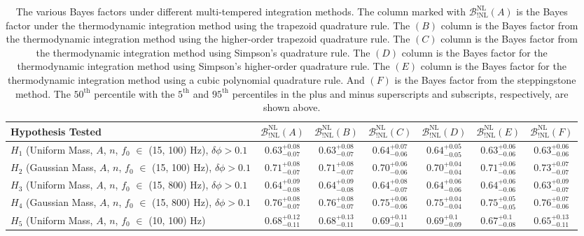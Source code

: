 \newpage

\begin{table}
\centering
\begin{tabularx}{1.0\textwidth}{l| c |c| c| c| c| c}
\hline\hline
 Hypothesis Tested  & $\mathcal{B}^{\mathrm{NL}}_{\mathrm{!NL}}(A)$  & $\mathcal{B}^{\mathrm{NL}}_{\mathrm{!NL}}(B)$ & $\mathcal{B}^{\mathrm{NL}}_{\mathrm{!NL}}(C)$ & $\mathcal{B}^{\mathrm{NL}}_{\mathrm{!NL}}(D)$ & $\mathcal{B}^{\mathrm{NL}}_{\mathrm{!NL}}(E)$ & $\mathcal{B}^{\mathrm{NL}}_{\mathrm{!NL}}(F)$\\
\hline\hline
$H_1$ (Uniform Mass, $A$, $n$, $f_0$ $\in$ (15, 100) Hz), $\delta \phi > 0.1$ &
$0.63^{+0.08}_{-0.07}$ & $0.63^{+0.08}_{-0.07}$ & $0.64^{+0.07}_{-0.06}$ & $0.64^{+0.05}_{-0.05}$ & $0.63^{+0.06}_{-0.06}$ & $0.63^{+0.06}_{-0.06}$ \\ 
\hline
$H_2$ (Gaussian Mass, $A$, $n$, $f_0$ $\in$ (15, 100) Hz), $\delta \phi > 0.1$ &
$0.71^{+0.08}_{-0.07}$ & $0.71^{+0.08}_{-0.07}$ & $0.70^{+0.06}_{-0.06}$ & $0.70^{+0.04}_{-0.04}$ & $0.71^{+0.06}_{-0.06}$ & $0.73^{+0.07}_{-0.07}$ \\ 
\hline
$H_3$ (Uniform Mass, $A$, $n$, $f_0$ $\in$ (15, 800) Hz), $\delta \phi > 0.1$ &
$0.64^{+0.09}_{-0.08}$ & $0.64^{+0.09}_{-0.08}$ & $0.64^{+0.08}_{-0.07}$ & $0.64^{+0.06}_{-0.06}$ & $0.64^{+0.06}_{-0.06}$ & $0.63^{+0.09}_{-0.07}$ \\ 
\hline
$H_4$ (Gaussian Mass, $A$, $n$, $f_0$ $\in$ (15, 800) Hz), $\delta \phi > 0.1$ &
$0.76^{+0.08}_{-0.07}$ & $0.76^{+0.08}_{-0.07}$ & $0.75^{+0.06}_{-0.06}$ & $0.75^{+0.04}_{-0.04}$ & $0.75^{+0.05}_{-0.05}$ & $0.76^{+0.07}_{-0.06}$ \\ 
\hline
$H_5$ (Uniform Mass, $A$, $n$, $f_0$ $\in$ (10, 100) Hz) &
$0.68^{+0.12}_{-0.11}$ & $0.68^{+0.13}_{-0.11}$ & $0.69^{+0.11}_{-0.1}$ & $0.69^{+0.1}_{-0.09}$ & $0.67^{+0.1}_{-0.08}$ & $0.65^{+0.13}_{-0.11}$ \\
\hline\hline
\end{tabularx}
\caption{The various Bayes factors under different multi-tempered integration methods. The column marked with $\mathcal{B}^{\mathrm{NL}}_{\mathrm{!NL}}(A)$ is the Bayes factor under the thermodynamic integration method using the trapezoid quadrature rule. The $(B)$ column is the Bayes factor from the thermodynamic integration method using the higher-order trapezoid quadrature rule. The $(C)$ column is the Bayes factor from the thermodynamic integration method using Simpson's quadrature rule. The $(D)$ column is the Bayes factor for the thermodynamic integration method using Simpson's higher-order quadrature rule. The $(E)$ column is the Bayes factor for the thermodynamic integration method using a cubic polynomial quadrature rule. And $(F)$ is the Bayes factor from the steppingstone method. The $50^{\mathrm{th}}$ percentile with the $5^{\mathrm{th}}$ and $95^{\mathrm{th}}$ percentiles in the plus and minus superscripts and subscripts, respectively, are shown above.}\label{table:Bayes}
\end{table}

